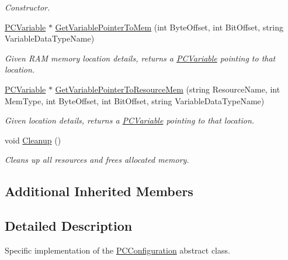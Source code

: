 \begin{DoxyCompactItemize}
\begin{DoxyCompactList}\small\item\em Constructor. \end{DoxyCompactList}\item 
\hyperlink{classpc__emulator_1_1PCVariable}{P\+C\+Variable} $\ast$ \hyperlink{classpc__emulator_1_1PCConfigurationImpl_ae083ff203d78246a9c2ea8f3d8ec20a8}{Get\+Variable\+Pointer\+To\+Mem} (int Byte\+Offset, int Bit\+Offset, string Variable\+Data\+Type\+Name)
\begin{DoxyCompactList}\small\item\em Given R\+AM memory location details, returns a \hyperlink{classpc__emulator_1_1PCVariable}{P\+C\+Variable} pointing to that location. \end{DoxyCompactList}\item 
\hyperlink{classpc__emulator_1_1PCVariable}{P\+C\+Variable} $\ast$ \hyperlink{classpc__emulator_1_1PCConfigurationImpl_ae09c2ded1759b34e1ea304f715c74fe3}{Get\+Variable\+Pointer\+To\+Resource\+Mem} (string Resource\+Name, int Mem\+Type, int Byte\+Offset, int Bit\+Offset, string Variable\+Data\+Type\+Name)
\begin{DoxyCompactList}\small\item\em Given location details, returns a \hyperlink{classpc__emulator_1_1PCVariable}{P\+C\+Variable} pointing to that location. \end{DoxyCompactList}\item 
void \hyperlink{classpc__emulator_1_1PCConfigurationImpl_a15dff3a523e1aac72268a30cfb2edf02}{Cleanup} ()\hypertarget{classpc__emulator_1_1PCConfigurationImpl_a15dff3a523e1aac72268a30cfb2edf02}{}\label{classpc__emulator_1_1PCConfigurationImpl_a15dff3a523e1aac72268a30cfb2edf02}

\begin{DoxyCompactList}\small\item\em Cleans up all resources and frees allocated memory. \end{DoxyCompactList}\end{DoxyCompactItemize}
\subsection*{Additional Inherited Members}


\subsection{Detailed Description}
Specific implementation of the \hyperlink{classpc__emulator_1_1PCConfiguration}{P\+C\+Configuration} abstract class. 

